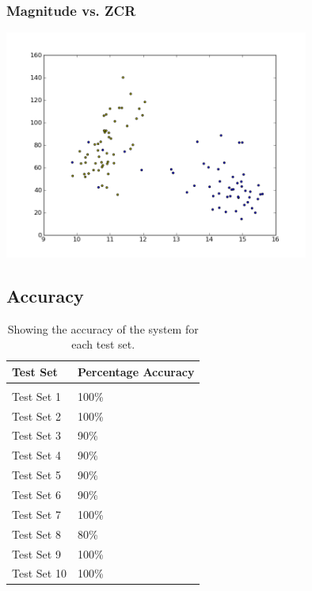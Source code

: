 \documentclass[12pt]{article} %
\begin{document}
\subsubsection{Magnitude vs. ZCR}
\begin{center}
  \includegraphics[width=0.75\textwidth]{mag_zcr}
\end{center}

\newpage

\subsection{Accuracy}
\label{sec:Accuracy}

\begin{table}[h]
\begin{center}
\begin{tabular}{p{} p{}}
Test Set & Percentage Accuracy \\
\hline \\
Test Set 1 & 100\% \\
Test Set 2 & 100\% \\
Test Set 3 & 90\% \\
Test Set 4 & 90\% \\
Test Set 5 & 90\% \\
Test Set 6 & 90\% \\
Test Set 7 & 100\% \\
Test Set 8 & 80\% \\
Test Set 9 & 100\% \\
Test Set 10 & 100\% \\
\end{tabular}
\caption{Showing the accuracy of the system for each test set.}
\label{TestSetStats}
\end{center}
\end{table}
\end{document}
